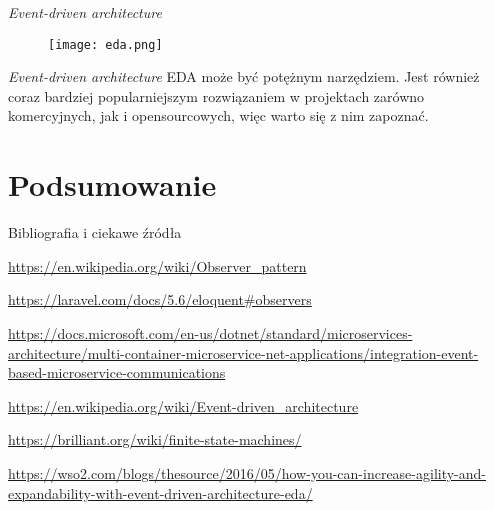 \begin{frame}{\emph{Event-driven architecture}}
	\begin{figure}[t]
		\centering
		\texttt{[image: eda.png]}
	\end{figure}
\end{frame}

\begin{frame}{\emph{Event-driven architecture}}
	EDA może być potężnym narzędziem. Jest również coraz bardziej popularniejszym rozwiązaniem w projektach zarówno komercyjnych, jak i opensourcowych, więc warto się z nim zapoznać.
\end{frame}

\section{Podsumowanie}

\begin{frame}{Bibliografia i ciekawe źródła}
  
	\begin{thebibliography}{9}
		
		\url{https://en.wikipedia.org/wiki/Observer_pattern}
		
		\url{https://laravel.com/docs/5.6/eloquent\#observers}
		
		\url{https://docs.microsoft.com/en-us/dotnet/standard/microservices-architecture/multi-container-microservice-net-applications/integration-event-based-microservice-communications}
		
		\url{https://en.wikipedia.org/wiki/Event-driven_architecture}
		
		\url{https://brilliant.org/wiki/finite-state-machines/}
		
		\url{https://wso2.com/blogs/thesource/2016/05/how-you-can-increase-agility-and-expandability-with-event-driven-architecture-eda/}
	
	\end{thebibliography}

\end{frame}

